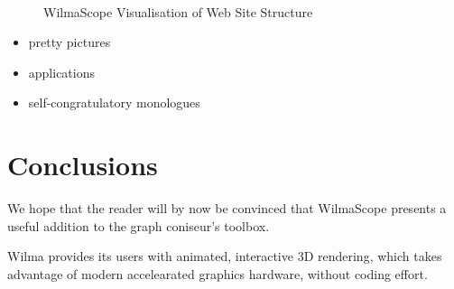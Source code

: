 \documentclass[runningheads]{cl2emult}
\begin{document}
\begin{figure}
\begin{center}
 \\
\caption{{\sc WilmaScope Visualisation of Web Site Structure}}
\label{fig-web}
\end{center}
\end{figure}

\begin{itemize}
\item pretty pictures
\item applications
\item self-congratulatory monologues
\end{itemize}

\section{Conclusions}
\label{sec:conclusions}

We hope that the reader will by now be convinced that WilmaScope presents a
useful addition to the graph coniseur's toolbox.  

Wilma provides its users with animated, interactive 3D rendering, which takes
advantage of modern accelearated graphics hardware, without coding effort.
\end{document}
